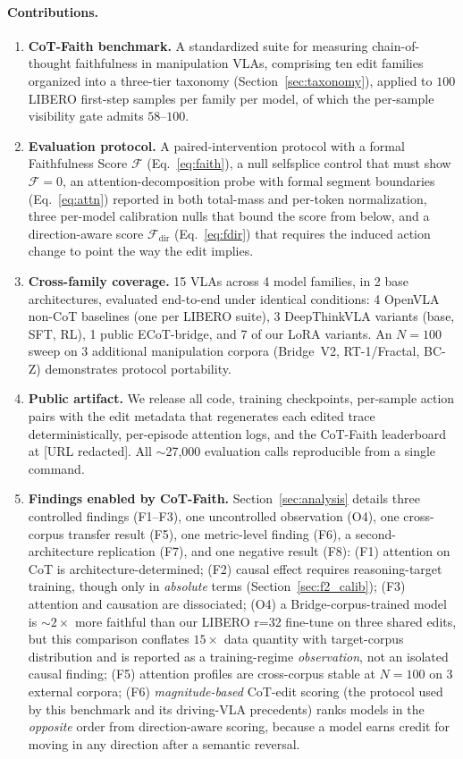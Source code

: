 \documentclass{article}
\begin{document}
\paragraph{Contributions.}
\begin{enumerate}
\item {\bf CoT-Faith benchmark.} A standardized suite for measuring chain-of-thought faithfulness in manipulation VLAs, comprising ten edit families organized into a three-tier taxonomy (Section~\ref{sec:taxonomy}), applied to $100$ LIBERO first-step samples per family per model, of which the per-sample visibility gate admits $58$--$100$.
\item {\bf Evaluation protocol.} A paired-intervention protocol with a formal Faithfulness Score $\mathcal{F}$ (Eq.~\ref{eq:faith}), a null selfsplice control that must show $\mathcal{F}\!=\!0$, an attention-decomposition probe with formal segment boundaries (Eq.~\ref{eq:attn}) reported in both total-mass and per-token normalization, three per-model calibration nulls that bound the score from below, and a direction-aware score $\mathcal{F}_{\text{dir}}$ (Eq.~\ref{eq:fdir}) that requires the induced action change to point the way the edit implies.
\item {\bf Cross-family coverage.} 15 VLAs across 4 model families, in 2 base architectures, evaluated end-to-end under identical conditions: 4 OpenVLA non-CoT baselines (one per LIBERO suite), 3 DeepThinkVLA variants (base, SFT, RL), 1 public ECoT-bridge, and 7 of our LoRA variants. An $N{=}100$ sweep on 3 additional manipulation corpora (Bridge~V2, RT-1/Fractal, BC-Z) demonstrates protocol portability.
\item {\bf Public artifact.} We release all code, training checkpoints, per-sample action pairs with the edit metadata that regenerates each edited trace deterministically, per-episode attention logs, and the CoT-Faith leaderboard at [URL redacted]. All $\sim$27{,}000 evaluation calls reproducible from a single command.
\item {\bf Findings enabled by CoT-Faith.} Section~\ref{sec:analysis} details three controlled findings (F1--F3), one uncontrolled observation (O4), one cross-corpus transfer result (F5), one metric-level finding (F6), a second-architecture replication (F7), and one negative result (F8): (F1) attention on CoT is architecture-determined; (F2) causal effect requires reasoning-target training, though only in \emph{absolute} terms (Section~\ref{sec:f2_calib}); (F3) attention and causation are dissociated; (O4) a Bridge-corpus-trained model is $\sim 2\times$ more faithful than our LIBERO r=32 fine-tune on three shared edits, but this comparison conflates $15\times$ data quantity with target-corpus distribution and is reported as a training-regime \emph{observation}, not an isolated causal finding; (F5) attention profiles are cross-corpus stable at $N{=}100$ on 3 external corpora; (F6) \emph{magnitude-based} CoT-edit scoring (the protocol used by this benchmark and its driving-VLA precedents) ranks models in the \emph{opposite} order from direction-aware scoring, because a model earns credit for moving in any direction after a semantic reversal.
\end{enumerate}
\end{document}
